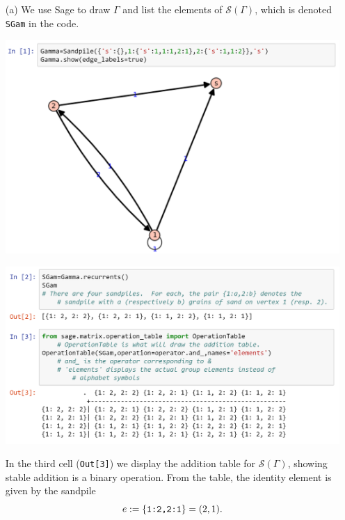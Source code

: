 \documentclass[../UNABRIDGEDalgebraNotesMSRI-UP2016.tex]{subfiles}
\begin{document}
\begin{frame}[fragile]
\begin{itemize}
\item[(a)] We use Sage to draw $\Gamma$ and list the elements of $\mathscr S(\Gamma)$, which is denoted \verb|SGam| in the code.

\includegraphics[scale=0.46]{sageFig1-1}
\end{itemize}
\end{frame}

\begin{frame}[fragile,c]
\begin{itemize}
\item[] %
\includegraphics[scale=0.46]{sageFig1-1pt2}

In the third cell (\verb|Out[3]|) we display the addition table for $\mathscr S(\Gamma)$, showing stable addition is a binary operation.  From the table, the identity element is given by the sandpile 
\[
e:=\{\verb|1:2,2:1|\}=(2,1).
\]
\end{itemize}
\end{frame}
\end{document}
